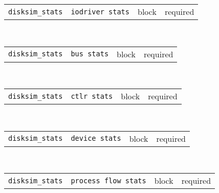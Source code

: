 \noindent 
\begin{tabular}{|p{1.5in}|p{3.5in}|p{0.5in}|p{0.5in}|}
\cline{1-4}
\texttt{disksim\_stats} & \texttt{iodriver stats} & block & required \\ 
\cline{1-4}
\end{tabular}\\ 
\noindent 
\begin{tabular}{|p{1.5in}|p{3.5in}|p{0.5in}|p{0.5in}|}
\cline{1-4}
\texttt{disksim\_stats} & \texttt{bus stats} & block & required \\ 
\cline{1-4}
\end{tabular}\\ 
\noindent 
\begin{tabular}{|p{1.5in}|p{3.5in}|p{0.5in}|p{0.5in}|}
\cline{1-4}
\texttt{disksim\_stats} & \texttt{ctlr stats} & block & required \\ 
\cline{1-4}
\end{tabular}\\ 
\noindent 
\begin{tabular}{|p{1.5in}|p{3.5in}|p{0.5in}|p{0.5in}|}
\cline{1-4}
\texttt{disksim\_stats} & \texttt{device stats} & block & required \\ 
\cline{1-4}
\end{tabular}\\ 
\noindent 
\begin{tabular}{|p{1.5in}|p{3.5in}|p{0.5in}|p{0.5in}|}
\cline{1-4}
\texttt{disksim\_stats} & \texttt{process flow stats} & block & required \\ 
\cline{1-4}
\end{tabular}\\ 
